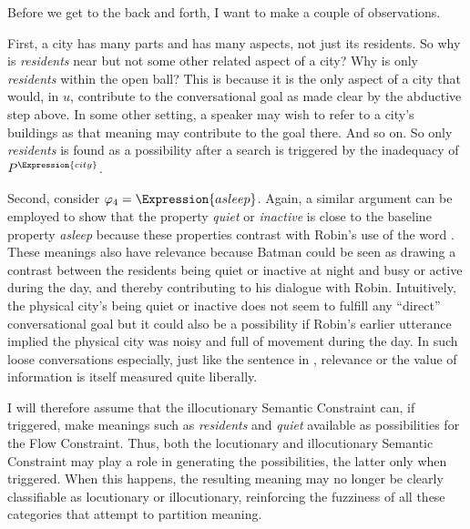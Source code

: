 Before we get to the back and forth, I want to make a couple of observations.

First, a city has many parts and has many aspects, not just its residents. So why is \emph{residents} near but not some other related aspect of a city? Why is only \emph{residents} within the open ball? This is because it is the only aspect of a city that would, in $u$, contribute to the conversational goal as made clear by the abductive step above. In some other setting, a speaker may wish to refer to a city's buildings as that meaning may contribute to the goal there. And so on. So only \emph{residents} is found as a possibility after a search is triggered by the inadequacy of $P^\Expression{city}$.


Second, consider $\varphi_4 = \Expression{asleep}$. Again, a similar argument can be employed to show that the property \emph{quiet} or \emph{inactive} is close to the baseline property \emph{asleep} because these properties contrast with Robin's use of the word . These meanings also have relevance because Batman could be seen as drawing a contrast between the residents being quiet or inactive at night and busy or active during the day, and thereby contributing to his dialogue with Robin. Intuitively, the physical city's being quiet or inactive does not seem to fulfill any ``direct'' conversational goal but it could also be a possibility if Robin's earlier utterance implied the physical city was noisy and full of movement during the day. In such loose conversations especially, just like the sentence  in , relevance or the value of information is itself measured quite liberally.

I will therefore assume that the illocutionary Semantic Constraint can, if triggered, make meanings such as \emph{residents} and \emph{quiet} available as possibilities for the Flow Constraint. Thus, both the locutionary and illocutionary Semantic Constraint may play a role in generating the possibilities, the latter only when triggered. When this happens, the resulting meaning may no longer be clearly classifiable as locutionary or illocutionary, reinforcing the fuzziness of all these categories that attempt to partition meaning.


